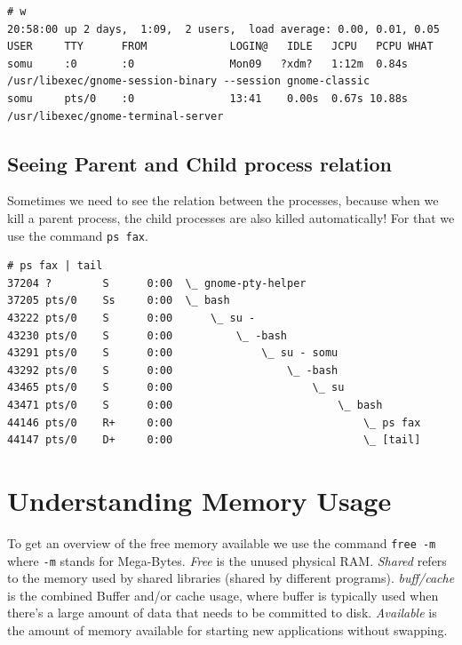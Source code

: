 \vspace{-15pt}
\begin{verbatim}
# w
20:58:00 up 2 days,  1:09,  2 users,  load average: 0.00, 0.01, 0.05
USER     TTY      FROM             LOGIN@   IDLE   JCPU   PCPU WHAT
somu     :0       :0               Mon09   ?xdm?   1:12m  0.84s /usr/libexec/gnome-session-binary --session gnome-classic
somu     pts/0    :0               13:41    0.00s  0.67s 10.88s /usr/libexec/gnome-terminal-server
\end{verbatim}
\vspace{-10pt}

\subsection{Seeing Parent and Child process relation}
Sometimes we need to see the relation between the processes, because when we kill a parent process, the child processes are also killed automatically! For that we use the command \verb|ps fax|. 

\vspace{-15pt}
\begin{verbatim}
# ps fax | tail
37204 ?        S      0:00  \_ gnome-pty-helper
37205 pts/0    Ss     0:00  \_ bash
43222 pts/0    S      0:00      \_ su -
43230 pts/0    S      0:00          \_ -bash
43291 pts/0    S      0:00              \_ su - somu
43292 pts/0    S      0:00                  \_ -bash
43465 pts/0    S      0:00                      \_ su
43471 pts/0    S      0:00                          \_ bash
44146 pts/0    R+     0:00                              \_ ps fax
44147 pts/0    D+     0:00                              \_ [tail]
\end{verbatim}
\vspace{-10pt}

	\section{Understanding Memory Usage}
To get an overview of the free memory available we use the command \verb|free -m| where \verb|-m| stands for Mega-Bytes. \textit{Free} is the unused physical RAM. \textit{Shared} refers to the memory used by shared libraries (shared by different programs). \textit{buff/cache} is the combined Buffer and/or cache usage, where buffer is typically used when there's a large amount of data that needs to be committed to disk. \textit{Available} is the amount of memory available for starting new applications without swapping. 

